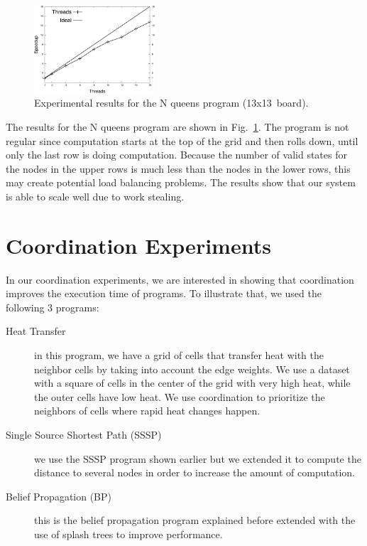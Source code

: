 \begin{figure}[h!]
     \centering
    \includegraphics[width=0.4\textwidth]{new-benchmarks/speedup_8queens-13.pdf}
    \caption{Experimental results for the N queens program (13x13~board).}
    \label{exp:8queens}
\end{figure}

The results for the N queens program are shown in Fig.~\ref{exp:8queens}. The program is not regular since computation starts at the top of the grid and then rolls down, until only the last row is doing computation. Because the number of valid states for the nodes in the upper rows is much less than the nodes in the lower rows, this may create potential load balancing problems. The results show that our system is able to scale well due to work stealing.

\section{Coordination Experiments}

In our coordination experiments, we are interested in showing that coordination improves the execution time of programs.
To illustrate that, we used the following 3 programs:

\begin{description}
   \item[Heat Transfer] in this program, we have a grid of cells that transfer heat with the neighbor cells by taking into account the edge weights. We use a dataset with a square of cells in the center of the grid with very high heat, while the outer cells have low heat. We use coordination to prioritize the neighbors of cells where rapid heat changes happen.
   \item[Single Source Shortest Path (SSSP)] we use the SSSP program shown earlier but we extended it to compute the distance to several nodes in order to increase the amount of computation.
   \item[Belief Propagation (BP)] this is the belief propagation program explained before extended with the use of splash trees to improve performance.
\end{description}

